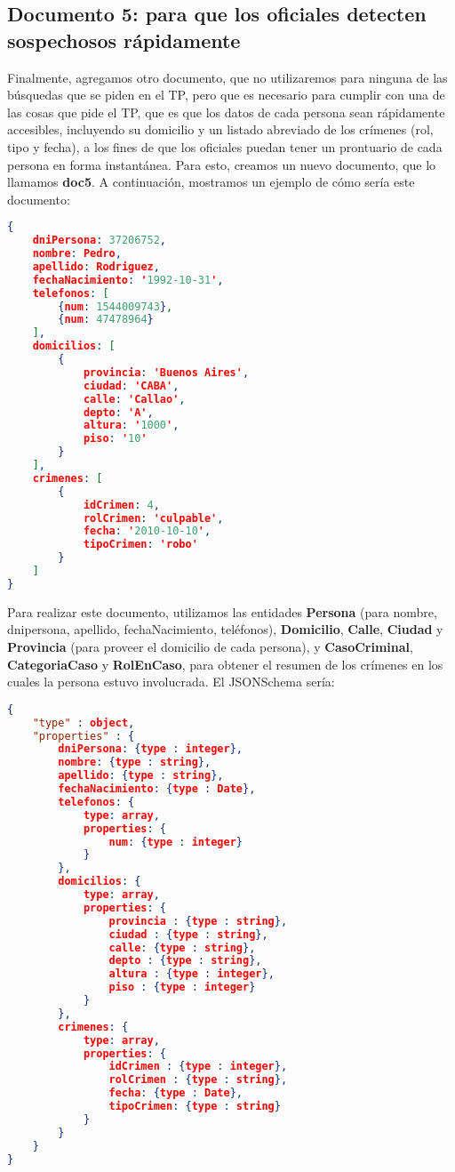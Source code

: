 \documentclass[11pt, a4paper]{article}
\begin{document}
\subsection{Documento 5: para que los oficiales detecten sospechosos rápidamente}

Finalmente, agregamos otro documento, que no utilizaremos para ninguna de las búsquedas que se piden en el TP, pero que es necesario para cumplir con una de las cosas que pide el TP, que es que los datos de cada persona sean rápidamente accesibles, incluyendo su domicilio y un listado abreviado de los crímenes (rol, tipo y fecha), a los fines de que los oficiales puedan tener un prontuario de cada persona en forma instantánea. Para esto, creamos un nuevo documento, que lo llamamos \textbf{doc5}. A continuación, mostramos un ejemplo de cómo sería este documento:
\begin{lstlisting}[language=json]
{
	dniPersona: 37206752,
	nombre: Pedro,
	apellido: Rodriguez,
	fechaNacimiento: '1992-10-31',
	telefonos: [
		{num: 1544009743}, 
		{num: 47478964}
	],
	domicilios: [
		{
			provincia: 'Buenos Aires',
			ciudad: 'CABA',
			calle: 'Callao',
			depto: 'A',
			altura: '1000',
			piso: '10'
		}
	], 
	crimenes: [
		{
			idCrimen: 4,
			rolCrimen: 'culpable',
			fecha: '2010-10-10',
			tipoCrimen: 'robo'
		}
	]
}
\end{lstlisting}

Para realizar este documento, utilizamos las entidades \textbf{Persona} (para nombre, dnipersona, apellido, fechaNacimiento, teléfonos), \textbf{Domicilio}, \textbf{Calle}, \textbf{Ciudad} y \textbf{Provincia} (para proveer el domicilio de cada persona), y \textbf{CasoCriminal}, \textbf{CategoriaCaso} y \textbf{RolEnCaso}, para obtener el resumen de los crímenes en los cuales la persona estuvo involucrada. El JSONSchema sería:
\begin{lstlisting}[language=json]
{
	"type" : object, 
	"properties" : {
		dniPersona: {type : integer},
		nombre: {type : string},
		apellido: {type : string},
		fechaNacimiento: {type : Date},
		telefonos: {
			type: array,
			properties: {
				num: {type : integer}
			}
		},
		domicilios: {
			type: array,
			properties: {
				provincia : {type : string},
				ciudad : {type : string},
				calle: {type : string},
				depto : {type : string},
				altura : {type : integer},
				piso : {type : integer}
			}
		},
		crimenes: {
			type: array,
			properties: {
				idCrimen : {type : integer},
				rolCrimen : {type : string},
				fecha: {type : Date},
				tipoCrimen: {type : string}
			}
		}
	}
}
\end{lstlisting}
\end{document}
